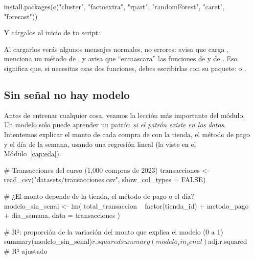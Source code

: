 \begin{rnoejecutar}
install.packages(c("cluster", "factoextra", "rpart", "randomForest",
                   "caret", "forecast"))
\end{rnoejecutar}

Y cárgalos al inicio de tu script:


Al cargarlos verás algunos mensajes normales, no errores: 
avisa que carga ,  menciona un método de
, y  avisa que ``enmascara'' las
funciones  de  y  de
. Eso significa que, si necesitas esas dos funciones, debes
escribirlas con su paquete:  o
.

\subsection{Sin señal no hay modelo}
\label{sec:m7-sin-senal}

Antes de entrenar cualquier cosa, veamos la lección más importante del módulo.
Un modelo solo puede aprender un patrón \emph{si el patrón existe en los
datos}. Intentemos explicar el monto de cada compra de
 con la tienda, el método de pago y el día de la
semana, usando una regresión lineal (la viste en el Módulo~\ref{cap:eda}).

\begin{rcode}
# Transacciones del curso (1,000 compras de 2023)
transacciones <- read_csv("datasets/transacciones.csv",
                          show_col_types = FALSE)

# ¿El monto depende de la tienda, el método de pago o el día?
modelo_sin_senal <- lm(
  total_transaccion ~ factor(tienda_id) + metodo_pago + dia_semana,
  data = transacciones
)

# R²: proporción de la variación del monto que explica el modelo (0 a 1)
summary(modelo_sin_senal)$r.squared
summary(modelo_sin_senal)$adj.r.squared   # R² ajustado
\end{rcode}

